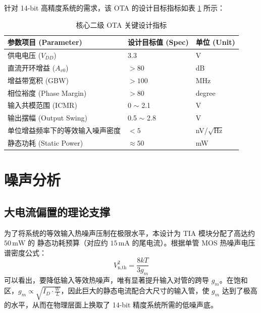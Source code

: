 针对 14-bit 高精度系统的需求，该 OTA 的设计目标指标如表 \ref{tab:ota_specs} 所示：

\begin{table}[h]
\centering
\caption{核心二级 OTA 关键设计指标}
\label{tab:ota_specs}
\begin{tabular}{@{}lll@{}}
\toprule
参数项目 (Parameter)           & 设计目标值 (Spec)        & 单位 (Unit) \\ \midrule
供电电压 ($V_{DD}$)            & 3.3                     & V           \\
直流开环增益 ($A_{v0}$)         & $> 80$                  & dB          \\
增益带宽积 (GBW)               & $> 100$                 & MHz         \\
相位裕度 (Phase Margin)        & $> 80$                  & degree      \\
输入共模范围 (ICMR)            & 0 $\sim$ 2.1            & V           \\
输出摆幅 (Output Swing)        & 0.5 $\sim$ 2.8          & V           \\
单位增益频率下的等效输入噪声密度  & $< 5$                   & nV/$\sqrt{\text{Hz}}$ \\
静态功耗 (Static Power)        & $\approx 50$            & mW          \\ \bottomrule
\end{tabular}
\end{table}

\section{噪声分析}
\subsection{大电流偏置的理论支撑}
为了将系统的等效输入热噪声压制在极限水平，本设计为 TIA 模块分配了高达约 $50\,\text{mW}$ 的
静态功耗预算（对应约 $15\,\text{mA}$ 的尾电流）。根据单管 MOS 热噪声电压谱密度公式：
\begin{equation}
    V_{\text{n,th}}^2 = \frac{8kT}{3g_m}
\end{equation}
可以看出，要降低输入等效热噪声，唯有显著提升输入对管的跨导 $g_m$。在饱和区，$g_m \propto \sqrt{I_D \cdot \frac{W}{L}}$，因此巨大的静态电流配合大尺寸的输入管，使 $g_m$ 达到了极高的水平，从而在物理层面上换取了 14-bit 精度系统所需的低噪声底。

